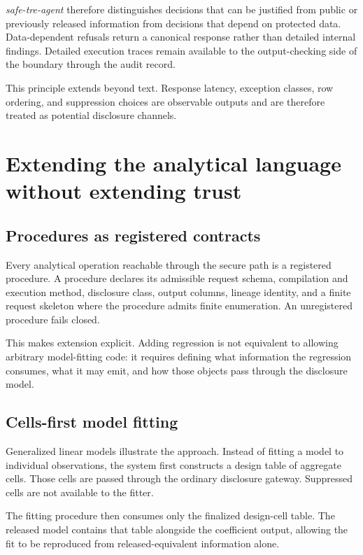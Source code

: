 \documentclass[11pt,a4paper]{article}
\begin{document}
\textit{safe-tre-agent} therefore distinguishes decisions that can be justified
from public or previously released information from decisions that depend on
protected data. Data-dependent refusals return a canonical response rather than
detailed internal findings. Detailed execution traces remain available to the
output-checking side of the boundary through the audit record.

This principle extends beyond text. Response latency, exception classes, row
ordering, and suppression choices are observable outputs and are therefore
treated as potential disclosure channels.

\section{Extending the analytical language without extending trust}
\label{sec:procedures}

\subsection{Procedures as registered contracts}

Every analytical operation reachable through the secure path is a registered
procedure. A procedure declares its admissible request schema, compilation and
execution method, disclosure class, output columns, lineage identity, and a
finite request skeleton where the procedure admits finite enumeration. An
unregistered procedure fails closed.

This makes extension explicit. Adding regression is not equivalent to allowing
arbitrary model-fitting code: it requires defining what information the
regression consumes, what it may emit, and how those objects pass through the
disclosure model.

\subsection{Cells-first model fitting}
\label{sec:cells-first}

Generalized linear models illustrate the approach. Instead of fitting a model
to individual observations, the system first constructs a design table of
aggregate cells. Those cells are passed through the ordinary disclosure
gateway. Suppressed cells are not available to the fitter.

The fitting procedure then consumes only the finalized design-cell table. The
released model contains that table alongside the coefficient output, allowing
the fit to be reproduced from released-equivalent information alone.
\end{document}
